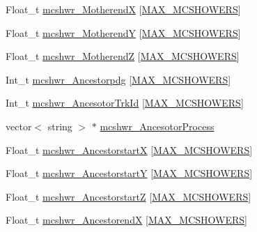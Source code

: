 \begin{DoxyCompactItemize}
\item 
Float\-\_\-t \hyperlink{classanatree_ac1c4d0298461ebb2d6e1fa172c2f00fd}{mcshwr\-\_\-\-Motherend\-X} \mbox{[}\hyperlink{anatree__core__v09410002_8h_ac14fc9ac3bf074dc1c2ab53cbd26449b}{M\-A\-X\-\_\-\-M\-C\-S\-H\-O\-W\-E\-R\-S}\mbox{]}
\item 
Float\-\_\-t \hyperlink{classanatree_ae86fa20aed4b4731ce33f28679a2bd48}{mcshwr\-\_\-\-Motherend\-Y} \mbox{[}\hyperlink{anatree__core__v09410002_8h_ac14fc9ac3bf074dc1c2ab53cbd26449b}{M\-A\-X\-\_\-\-M\-C\-S\-H\-O\-W\-E\-R\-S}\mbox{]}
\item 
Float\-\_\-t \hyperlink{classanatree_a384403fb919a693d2e02963b8eb8d326}{mcshwr\-\_\-\-Motherend\-Z} \mbox{[}\hyperlink{anatree__core__v09410002_8h_ac14fc9ac3bf074dc1c2ab53cbd26449b}{M\-A\-X\-\_\-\-M\-C\-S\-H\-O\-W\-E\-R\-S}\mbox{]}
\item 
Int\-\_\-t \hyperlink{classanatree_a058085d93e1f3db4e6ba67ce695cbdf2}{mcshwr\-\_\-\-Ancestorpdg} \mbox{[}\hyperlink{anatree__core__v09410002_8h_ac14fc9ac3bf074dc1c2ab53cbd26449b}{M\-A\-X\-\_\-\-M\-C\-S\-H\-O\-W\-E\-R\-S}\mbox{]}
\item 
Int\-\_\-t \hyperlink{classanatree_a2228476d1abad312b8750b73352d0639}{mcshwr\-\_\-\-Ancesotor\-Trk\-Id} \mbox{[}\hyperlink{anatree__core__v09410002_8h_ac14fc9ac3bf074dc1c2ab53cbd26449b}{M\-A\-X\-\_\-\-M\-C\-S\-H\-O\-W\-E\-R\-S}\mbox{]}
\item 
vector$<$ string $>$ $\ast$ \hyperlink{classanatree_aa5d90860444fade2049cb26233e1c2d0}{mcshwr\-\_\-\-Ancesotor\-Process}
\item 
Float\-\_\-t \hyperlink{classanatree_ac9eb9f5fa2ddba574ffaa0c420d4ed96}{mcshwr\-\_\-\-Ancestorstart\-X} \mbox{[}\hyperlink{anatree__core__v09410002_8h_ac14fc9ac3bf074dc1c2ab53cbd26449b}{M\-A\-X\-\_\-\-M\-C\-S\-H\-O\-W\-E\-R\-S}\mbox{]}
\item 
Float\-\_\-t \hyperlink{classanatree_a93f564960611f33b00267f4fe7441b46}{mcshwr\-\_\-\-Ancestorstart\-Y} \mbox{[}\hyperlink{anatree__core__v09410002_8h_ac14fc9ac3bf074dc1c2ab53cbd26449b}{M\-A\-X\-\_\-\-M\-C\-S\-H\-O\-W\-E\-R\-S}\mbox{]}
\item 
Float\-\_\-t \hyperlink{classanatree_ad23acad17808f6e2253849e1912467b7}{mcshwr\-\_\-\-Ancestorstart\-Z} \mbox{[}\hyperlink{anatree__core__v09410002_8h_ac14fc9ac3bf074dc1c2ab53cbd26449b}{M\-A\-X\-\_\-\-M\-C\-S\-H\-O\-W\-E\-R\-S}\mbox{]}
\item 
Float\-\_\-t \hyperlink{classanatree_a21f95adb52a06677f22a971e6d7078ab}{mcshwr\-\_\-\-Ancestorend\-X} \mbox{[}\hyperlink{anatree__core__v09410002_8h_ac14fc9ac3bf074dc1c2ab53cbd26449b}{M\-A\-X\-\_\-\-M\-C\-S\-H\-O\-W\-E\-R\-S}\mbox{]}

\end{DoxyCompactItemize}
